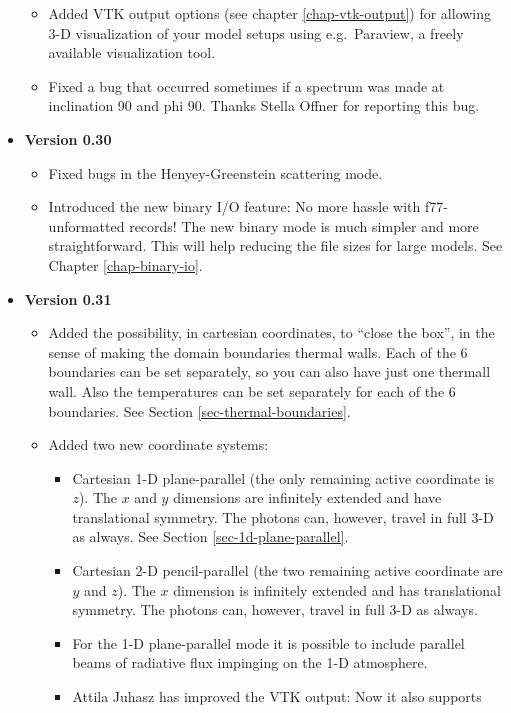 \documentclass{report}
\begin{document}
\begin{itemize}
\begin{itemize}
  \item Added VTK output options (see chapter \ref{chap-vtk-output}) for
    allowing 3-D visualization of your model setups using e.g.\ Paraview, a
    freely available visualization tool.
  \item Fixed a bug that occurred sometimes if a spectrum was made at
    inclination 90 and phi 90. Thanks Stella Offner for reporting this bug.
  \end{itemize}
\item {\bf Version 0.30}
  \begin{itemize}
  \item Fixed bugs in the Henyey-Greenstein scattering mode.
  \item Introduced the new binary I/O feature: No more hassle with
    f77-unformatted records! The new binary mode is much simpler and more
    straightforward. This will help reducing the file sizes for large models.
    See Chapter \ref{chap-binary-io}. 
  \end{itemize}
\item {\bf Version 0.31}
  \begin{itemize}
  \item Added the possibility, in cartesian coordinates, to ``close the
    box'', in the sense of making the domain boundaries thermal walls.
    Each of the 6 boundaries can be set separately, so you can also have
    just one thermall wall. Also the temperatures can be set separately
    for each of the 6 boundaries. See Section \ref{sec-thermal-boundaries}.
  \item Added two new coordinate systems:
    \begin{itemize}
    \item Cartesian 1-D plane-parallel (the only remaining active coordinate
      is $z$). The $x$ and $y$ dimensions are infinitely extended and 
      have translational symmetry. The photons can, however, travel in 
      full 3-D as always. See Section \ref{sec-1d-plane-parallel}.
    \item Cartesian 2-D pencil-parallel (the two remaining active coordinate
      are $y$ and $z$). The $x$ dimension is infinitely extended and 
      has translational symmetry. The photons can, however, travel in 
      full 3-D as always.
    \item For the 1-D plane-parallel mode it is possible to include parallel
      beams of radiative flux impinging on the 1-D atmosphere.
    \item Attila Juhasz has improved the VTK output: Now it also supports

\end{itemize}
\end{itemize}
\end{itemize}
\end{document}
